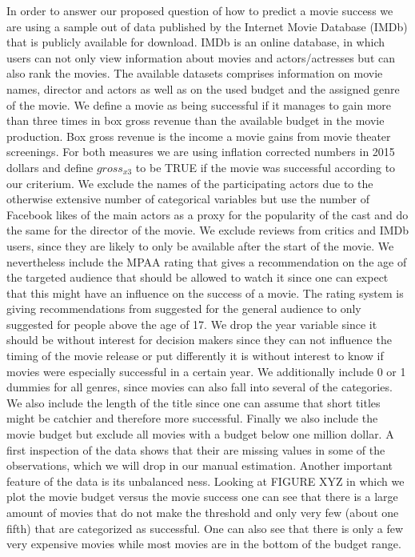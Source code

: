 \documentclass[
]{article}
\begin{document}
In order to answer our proposed question of how to predict a movie
success we are using a sample out of data published by the Internet
Movie Database (IMDb) that is publicly available for download. IMDb is
an online database, in which users can not only view information about
movies and actors/actresses but can also rank the movies. The available
datasets comprises information on movie names, director and actors as
well as on the used budget and the assigned genre of the movie. We
define a movie as being successful if it manages to gain more than three
times in box gross revenue than the available budget in the movie
production. Box gross revenue is the income a movie gains from movie
theater screenings. For both measures we are using inflation corrected
numbers in 2015 dollars and define \(gross_{x3}\) to be TRUE if the
movie was successful according to our criterium. We exclude the names of
the participating actors due to the otherwise extensive number of
categorical variables but use the number of Facebook likes of the main
actors as a proxy for the popularity of the cast and do the same for the
director of the movie. We exclude reviews from critics and IMDb users,
since they are likely to only be available after the start of the movie.
We nevertheless include the MPAA rating that gives a recommendation on
the age of the targeted audience that should be allowed to watch it
since one can expect that this might have an influence on the success of
a movie. The rating system is giving recommendations from suggested for
the general audience to only suggested for people above the age of 17.
We drop the year variable since it should be without interest for
decision makers since they can not influence the timing of the movie
release or put differently it is without interest to know if movies were
especially successful in a certain year. We additionally include 0 or 1
dummies for all genres, since movies can also fall into several of the
categories. We also include the length of the title since one can assume
that short titles might be catchier and therefore more successful.
Finally we also include the movie budget but exclude all movies with a
budget below one million dollar. A first inspection of the data shows
that their are missing values in some of the observations, which we will
drop in our manual estimation. Another important feature of the data is
its unbalanced ness. Looking at FIGURE XYZ in which we plot the movie
budget versus the movie success one can see that there is a large amount
of movies that do not make the threshold and only very few (about one
fifth) that are categorized as successful. One can also see that there
is only a few very expensive movies while most movies are in the bottom
of the budget range.
\end{document}
